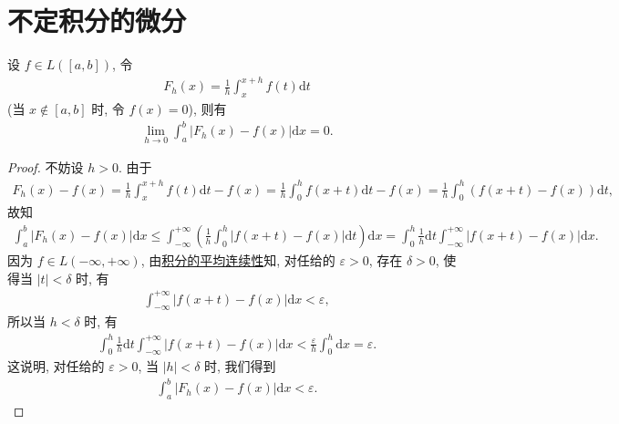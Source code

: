 \documentclass[../../main.tex]{subfiles}%
\begin{document}
\section{不定积分的微分}

\begin{lemma}
设 $f\in L([a,b])$, 令
\begin{align*}
F_h(x) = \frac{1}{h}\int_x^{x+h} f(t)\mathrm{d}t
\end{align*}
(当 $x\notin [a,b]$ 时, 令 $f(x)=0$), 则有
\begin{align*}
\lim_{h\to 0}\int_a^b |F_h(x)-f(x)|\mathrm{d}x = 0.
\end{align*}
\end{lemma}
\begin{proof}

不妨设 $h>0$. 由于
\begin{align*}
F_h(x)-f(x) = \frac{1}{h}\int_x^{x+h} f(t)\mathrm{d}t - f(x) 
= \frac{1}{h}\int_0^h f(x+t)\mathrm{d}t - f(x) 
= \frac{1}{h}\int_0^h (f(x+t)-f(x))\mathrm{d}t,
\end{align*}
故知
\begin{align*}
\int_a^b |F_h(x)-f(x)|\mathrm{d}x \leqslant \int_{-\infty}^{+\infty} \left(\frac{1}{h}\int_0^h |f(x+t)-f(x)|\mathrm{d}t\right)\mathrm{d}x 
= \int_0^h \frac{1}{h}\mathrm{d}t \int_{-\infty}^{+\infty} |f(x+t)-f(x)|\mathrm{d}x.
\end{align*}
因为 $f\in L(-\infty,+\infty)$, 由\hyperref[theorem:积分的平均连续性]{积分的平均连续性}知, 对任给的 $\varepsilon>0$, 存在 $\delta>0$, 使得当 $|t|<\delta$ 时, 有
\begin{align*}
\int_{-\infty}^{+\infty} |f(x+t)-f(x)|\mathrm{d}x < \varepsilon,
\end{align*}
所以当 $h<\delta$ 时, 有
\begin{align*}
\int_0^h \frac{1}{h}\mathrm{d}t \int_{-\infty}^{+\infty} |f(x+t)-f(x)|\mathrm{d}x < \frac{\varepsilon}{h}\int_0^h \mathrm{d}x = \varepsilon.
\end{align*}
这说明, 对任给的 $\varepsilon>0$, 当 $|h|<\delta$ 时, 我们得到
\begin{align*}
\int_a^b |F_h(x)-f(x)|\mathrm{d}x < \varepsilon.
\end{align*}

\end{proof}
\end{document}

